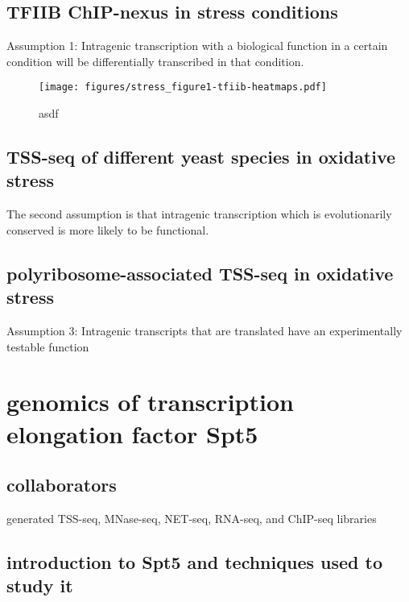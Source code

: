 \documentclass[9pt, letterpaper]{article}
\begin{document}
\subsection{TFIIB ChIP-nexus in stress conditions}

Assumption 1: Intragenic transcription with a biological function in a certain condition will be differentially transcribed in that condition.

\begin{figure}[H]
\centering
\texttt{[image: figures/stress\_figure1-tfiib-heatmaps.pdf]}
\caption{asdf}
\label{fig:stress_tfiib-heatmaps}
\end{figure}

\subsection{TSS-seq of different yeast species in oxidative stress}

The second assumption is that intragenic transcription which is evolutionarily conserved is more likely to be functional.

\subsection{polyribosome-associated TSS-seq in oxidative stress}

Assumption 3: Intragenic transcripts that are translated have an experimentally testable function

\section{genomics of transcription elongation factor Spt5}

\subsection{collaborators}

\begin{description}[align=right, labelwidth=5cm, noitemsep]
    \item [Ameet Shetty] generated TSS-seq, MNase-seq, NET-seq, RNA-seq, and ChIP-seq libraries
\end{description}

\subsection{introduction to Spt5 and techniques used to study it}
\end{document}
